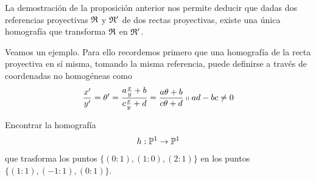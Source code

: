 \begin{obs}
	La demostración de la proposición anterior nos permite deducir que dadas dos referencias proyectivas $\mathfrak{R}$ y $\mathfrak{R'}$ de dos rectas proyectivas, existe una única homografía que transforma $\mathfrak{R}$ en $\mathfrak{R'}$.
\end{obs}
Veamos un ejemplo. Para ello recordemos primero que una homografía de la recta proyectiva en sí misma, tomando la misma referencia,  puede definirse a través de coordenadas no homogéneas como
\begin{equation}
	\label{C5_eq_homografia_nohom}
	\frac{x'}{y'}=\theta'=\frac{a\frac{x}{y}+b}{c\frac{x}{y}+d}=\frac{a\theta+b}{c\theta +d}\shortparallel ad-bc\not=0
\end{equation}
\begin{exa}
	Encontrar la homografía 
	\[h:\mathbb{P}^1\rightarrow \mathbb{P}^1\] 
	que trasforma los puntos $\{(0:1),(1:0),(2:1)\}$ en los puntos $\{(1:1),(-1:1),(0:1)\}$.\\
	

\end{exa}
